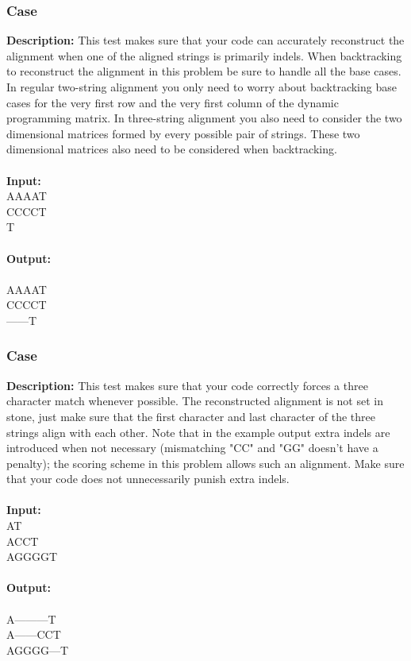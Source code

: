 \documentclass{article}
\newcommand{\code}[1]{{\fontfamily{pcr}\selectfont #1}}
\begin{document}
\subsubsection*{Case }
\hline \vspace{5}
\textbf{Description:} This test makes sure that your code can accurately reconstruct the alignment when one of the aligned strings is primarily indels. When backtracking to reconstruct the alignment in this problem be sure to handle all the base cases. In regular two-string alignment you only need to worry about backtracking base cases for the very first row and the very first column of the dynamic programming matrix. In three-string alignment you also need to consider the two dimensional matrices formed by every possible pair of strings. These two dimensional matrices also need to be considered when backtracking.\\ \\
\noindent \textbf{Input:}\\
\code{AAAAT\\CCCCT\\T}\\ \\
\noindent \textbf{Output:}\\
\code{1\\AAAAT\\CCCCT\\------T}

\subsubsection*{Case }
\hline \vspace{5}
\textbf{Description:} This test makes sure that your code correctly forces a three character match whenever possible. The reconstructed alignment is not set in stone, just make sure that the first character and last character of the three strings align with each other. Note that in the example output extra indels are introduced when not necessary (mismatching "CC" and "GG" doesn’t have a penalty); the scoring scheme in this problem allows such an alignment. Make sure that your code does not unnecessarily punish extra indels.\\ \\
\noindent \textbf{Input:}\\
\code{AT\\ACCT\\AGGGGT}\\ \\
\noindent \textbf{Output:}\\
\code{2\\A---------T\\A------CCT\\AGGGG---T}
\pagebreak
\end{document}
